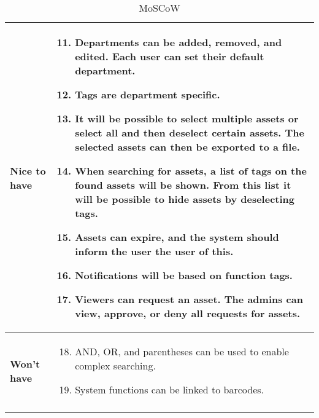 \begin{longtable}{p{3.2cm} p{10cm}}
        \textbf{Nice to have} & 
        \vspace*{-7mm}
        \begin{enumerate} \setcounter{enumi}{10} \itemsep0em 
            \item Departments can be added, removed, and edited. Each user can set their default department.
            
            \item Tags are department specific.
            
            \item It will be possible to select multiple assets or select all and then deselect certain assets. The selected assets can then be exported to a file.
            
            \item When searching for assets, a list of tags on the found assets will be shown. From this list it will be possible to hide assets by deselecting tags.
            
            \item Assets can expire, and the system should inform the user the user of this.
            
            \item Notifications will be based on function tags.
            
            \item Viewers can request an asset. The admins can view, approve, or deny all requests for assets.
            
        \end{enumerate}
        \\
        \hline
        \textbf{Won't have} & 
        \vspace*{-7mm}
        \begin{enumerate} \setcounter{enumi}{17} \itemsep0em 
            \item AND, OR, and parentheses can be used to enable complex searching.
            \item System functions can be linked to barcodes.
        \end{enumerate}
        \\
        \hline
    \caption{MoSCoW}
    \label{tab:moscow}
   
\end{longtable}


%    
%    
%    

